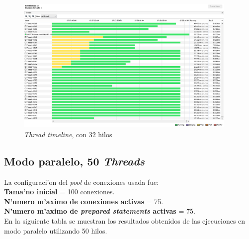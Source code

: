 \begin{figure}[H]
\centering
\includegraphics[width=0.95\textwidth]{images/Running_Time_32_Threads}
\caption{\emph{Thread timeline}, con 32 hilos}
\label{fig:6.32}
\end{figure}

\subsection{Modo paralelo, 50 \emph{Threads}}
\noindent
La configuraci'on del \emph{pool} de conexiones usada fue: \\

\textbf{Tama'no inicial} = 100 conexiones. \\
\textbf{N'umero m'aximo de conexiones activas} = 75. \\
\textbf{N'umero m'aximo de \emph{prepared statements} activas} = 75. \\

En la siguiente tabla se muestran los resultados obtenidos de las ejecuciones en modo paralelo utilizando 50 hilos. \\

\begin{table}[H]
\begin{center}
\end{center}
\caption{Resultados en modo paralelo con 50 hilos}
\end{table}

